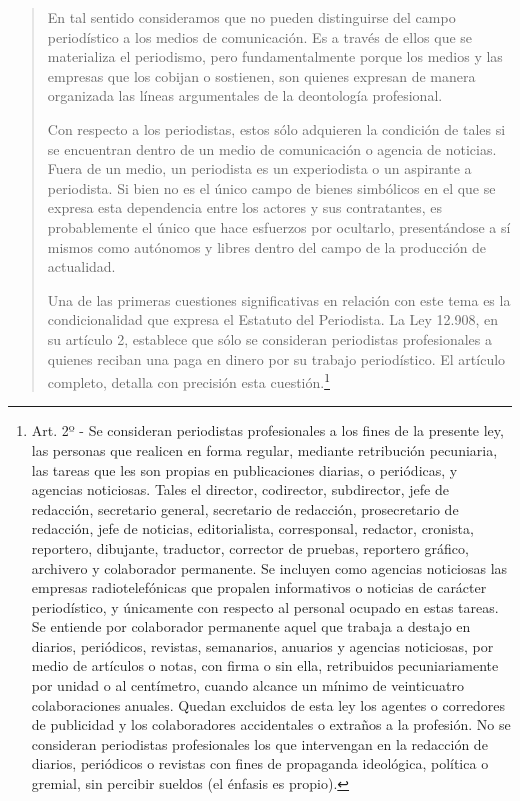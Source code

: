 \begin{quote}
En tal sentido consideramos que no pueden distinguirse del campo periodístico a los medios de comunicación. Es a través de ellos que se materializa el periodismo, pero fundamentalmente porque los medios y las empresas que los cobijan o sostienen, son quienes expresan de manera organizada las líneas argumentales de la deontología profesional.

Con respecto a los periodistas, estos sólo adquieren la condición de tales si se encuentran dentro de un medio de comunicación o agencia de noticias. Fuera de un medio, un periodista es un experiodista o un aspirante a periodista. Si bien no es el único campo de bienes simbólicos en el que se expresa esta dependencia entre los actores y sus contratantes, es probablemente el único que hace esfuerzos por ocultarlo, presentándose a sí mismos como autónomos y libres dentro del campo de la producción de actualidad.

Una de las primeras cuestiones significativas en relación con este tema es la condicionalidad que expresa el Estatuto del Periodista. La Ley 12.908, en su artículo 2, establece que sólo se consideran periodistas profesionales a quienes reciban una paga en dinero por su trabajo periodístico. El artículo completo, detalla con precisión esta cuestión.\footnote{Art. 2º - Se consideran periodistas profesionales a los fines de la presente ley, las personas que realicen en forma regular, mediante retribución pecuniaria, las tareas que les son propias en publicaciones diarias, o periódicas, y agencias noticiosas. Tales el director, codirector, subdirector, jefe de redacción, secretario general, secretario de redacción, prosecretario de redacción, jefe de noticias, editorialista, corresponsal, redactor, cronista, reportero, dibujante, traductor, corrector de pruebas, reportero gráfico, archivero y colaborador permanente. Se incluyen como agencias noticiosas las empresas radiotelefónicas que propalen informativos o noticias de carácter periodístico, y únicamente con respecto al personal ocupado en estas tareas.
	Se entiende por colaborador permanente aquel que trabaja a destajo en diarios, periódicos, revistas, semanarios, anuarios y agencias noticiosas, por medio de artículos o notas, con firma o sin ella, retribuidos pecuniariamente por unidad o al centímetro, cuando alcance un mínimo de veinticuatro colaboraciones anuales. Quedan excluidos de esta ley los agentes o corredores de publicidad y los colaboradores accidentales o extraños a la profesión. No se consideran periodistas profesionales los que intervengan en la redacción de diarios, periódicos o revistas con fines de propaganda ideológica, política o gremial, sin percibir sueldos (el énfasis es propio).}


\end{quote}
